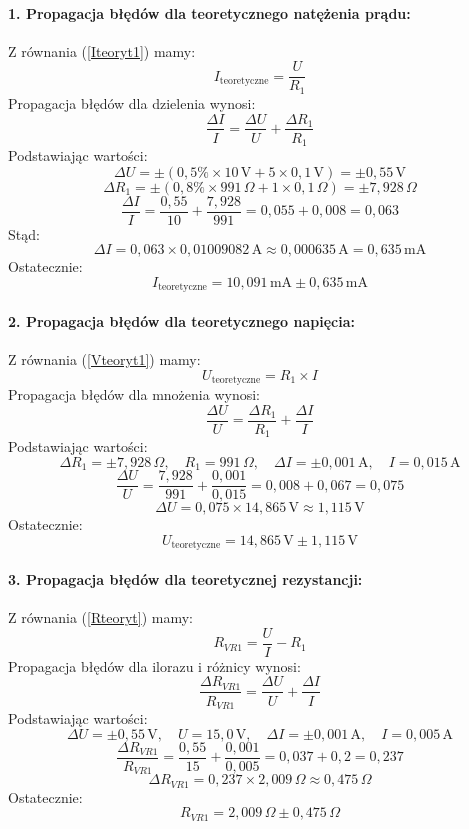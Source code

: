 \documentclass[,a4paper,12pt]{article}
\begin{document}
\paragraph{1. Propagacja błędów dla teoretycznego natężenia prądu:}
Z równania (\ref{Iteoryt1}) mamy:
\[
I_{\text{teoretyczne}} = \frac{U}{R_1}
\]
Propagacja błędów dla dzielenia wynosi:
\[
\frac{\Delta I}{I} = \frac{\Delta U}{U} + \frac{\Delta R_1}{R_1}
\]
Podstawiając wartości:
\[
\Delta U = \pm (0,5\% \times 10 \, \text{V} + 5 \times 0,1 \, \text{V}) = \pm 0,55 \, \text{V}
\]
\[
\Delta R_1 = \pm (0,8\% \times 991 \, \Omega + 1 \times 0,1 \, \Omega) = \pm 7,928 \, \Omega
\]
\[
\frac{\Delta I}{I} = \frac{0,55}{10} + \frac{7,928}{991} = 0,055 + 0,008 = 0,063
\]
Stąd:
\[
\Delta I = 0,063 \times 0,01009082 \, \text{A} \approx 0,000635 \, \text{A} = 0,635 \, \text{mA}
\]
Ostatecznie:
\[
I_{\text{teoretyczne}} = 10,091 \, \text{mA} \pm 0,635 \, \text{mA}
\]

\paragraph{2. Propagacja błędów dla teoretycznego napięcia:}
Z równania (\ref{Vteoryt1}) mamy:
\[
U_{\text{teoretyczne}} = R_1 \times I
\]
Propagacja błędów dla mnożenia wynosi:
\[
\frac{\Delta U}{U} = \frac{\Delta R_1}{R_1} + \frac{\Delta I}{I}
\]
Podstawiając wartości:
\[
\Delta R_1 = \pm 7,928 \, \Omega, \quad R_1 = 991 \, \Omega, \quad \Delta I = \pm 0,001 \, \text{A}, \quad I = 0,015 \, \text{A}
\]
\[
\frac{\Delta U}{U} = \frac{7,928}{991} + \frac{0,001}{0,015} = 0,008 + 0,067 = 0,075
\]
\[
\Delta U = 0,075 \times 14,865 \, \text{V} \approx 1,115 \, \text{V}
\]
Ostatecznie:
\[
U_{\text{teoretyczne}} = 14,865 \, \text{V} \pm 1,115 \, \text{V}
\]

\paragraph{3. Propagacja błędów dla teoretycznej rezystancji:}
Z równania (\ref{Rteoryt}) mamy:
\[
R_{VR1} = \frac{U}{I} - R_1
\]
Propagacja błędów dla ilorazu i różnicy wynosi:
\[
\frac{\Delta R_{VR1}}{R_{VR1}} = \frac{\Delta U}{U} + \frac{\Delta I}{I}
\]
Podstawiając wartości:
\[
\Delta U = \pm 0,55 \, \text{V}, \quad U = 15,0 \, \text{V}, \quad \Delta I = \pm 0,001 \, \text{A}, \quad I = 0,005 \, \text{A}
\]
\[
\frac{\Delta R_{VR1}}{R_{VR1}} = \frac{0,55}{15} + \frac{0,001}{0,005} = 0,037 + 0,2 = 0,237
\]
\[
\Delta R_{VR1} = 0,237 \times 2,009 \, \Omega \approx 0,475 \, \Omega
\]
Ostatecznie:
\[
R_{VR1} = 2,009 \, \Omega \pm 0,475 \, \Omega
\]
\end{document}

